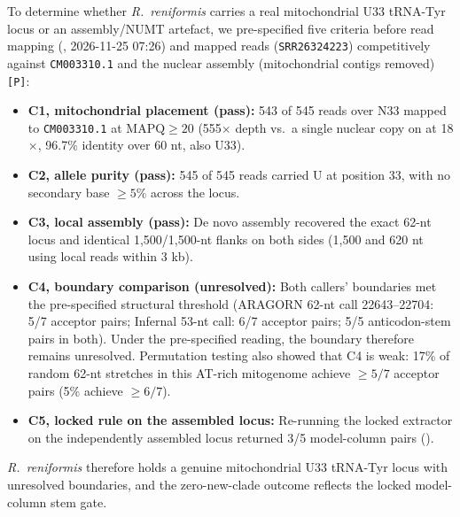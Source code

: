 \documentclass[11pt, a4paper]{article}
\begin{document}
To determine whether \textit{R.\ reniformis} carries a real mitochondrial U33 tRNA-Tyr locus or an assembly/NUMT artefact, we pre-specified five criteria before read mapping (, 2026-11-25 07:26) and mapped reads (\texttt{SRR26324223}) competitively against \texttt{CM003310.1} and the nuclear assembly  (mitochondrial contigs removed) \texttt{[P]}:
\begin{itemize}[leftmargin=1.4em, itemsep=0.2em]
\item \textbf{C1, mitochondrial placement (pass):} 543 of 545 reads over N33 mapped to \texttt{CM003310.1} at $\mathrm{MAPQ} \ge 20$ (555$\times$ depth vs.\ a single nuclear copy on  at 18$\times$, 96.7\% identity over 60 nt, also U33).
\item \textbf{C2, allele purity (pass):} 545 of 545 reads carried U at position 33, with no secondary base $\ge 5\%$ across the locus.
\item \textbf{C3, local assembly (pass):} De novo assembly recovered the exact 62-nt locus and identical 1,500/1,500-nt flanks on both sides (1,500 and 620 nt using local reads within 3 kb).
\item \textbf{C4, boundary comparison (unresolved):} Both callers' boundaries met the pre-specified structural threshold (ARAGORN 62-nt call 22643--22704: 5/7 acceptor pairs; Infernal 53-nt call: 6/7 acceptor pairs; 5/5 anticodon-stem pairs in both). Under the pre-specified reading, the boundary therefore remains unresolved. Permutation testing also showed that C4 is weak: 17\% of random 62-nt stretches in this AT-rich mitogenome achieve $\ge 5/7$ acceptor pairs (5\% achieve $\ge 6/7$).
\item \textbf{C5, locked rule on the assembled locus:} Re-running the locked extractor on the independently assembled locus returned 3/5 model-column pairs ().
\end{itemize}
\textit{R.\ reniformis} therefore holds a genuine mitochondrial U33 tRNA-Tyr locus with unresolved boundaries, and the zero-new-clade outcome reflects the locked model-column stem gate.
\end{document}
